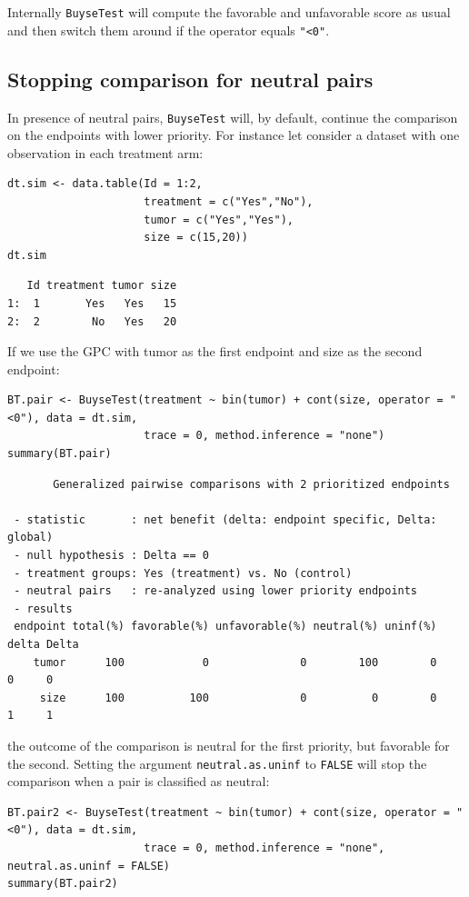 \documentclass[12pt]{article}
\begin{document}
Internally \texttt{BuyseTest} will compute the favorable and unfavorable
score as usual and then switch them around if the operator equals
\texttt{"<0"}.

\clearpage

\subsection{Stopping comparison for neutral pairs}
\label{sec:org4b1a2e3}
In presence of neutral pairs, \texttt{BuyseTest} will, by default, continue
the comparison on the endpoints with lower priority. For instance let
consider a dataset with one observation in each treatment arm:
\lstset{language=r,label= ,caption= ,captionpos=b,numbers=none}
\begin{lstlisting}
dt.sim <- data.table(Id = 1:2,
                     treatment = c("Yes","No"),
                     tumor = c("Yes","Yes"),
                     size = c(15,20))
dt.sim
\end{lstlisting}

\begin{verbatim}
   Id treatment tumor size
1:  1       Yes   Yes   15
2:  2        No   Yes   20
\end{verbatim}


\bigskip

If we use the GPC with tumor as the first endpoint and size as the
second endpoint:
\lstset{language=r,label= ,caption= ,captionpos=b,numbers=none}
\begin{lstlisting}
BT.pair <- BuyseTest(treatment ~ bin(tumor) + cont(size, operator = "<0"), data = dt.sim,
                     trace = 0, method.inference = "none")
summary(BT.pair)
\end{lstlisting}

\begin{verbatim}
       Generalized pairwise comparisons with 2 prioritized endpoints

 - statistic       : net benefit (delta: endpoint specific, Delta: global) 
 - null hypothesis : Delta == 0 
 - treatment groups: Yes (treatment) vs. No (control) 
 - neutral pairs   : re-analyzed using lower priority endpoints
 - results
 endpoint total(%) favorable(%) unfavorable(%) neutral(%) uninf(%) delta Delta
    tumor      100            0              0        100        0     0     0
     size      100          100              0          0        0     1     1
\end{verbatim}

the outcome of the comparison is neutral for the first priority, but
favorable for the second. Setting the argument \texttt{neutral.as.uninf} to
\texttt{FALSE} will stop the comparison when a pair is classified as neutral:
\lstset{language=r,label= ,caption= ,captionpos=b,numbers=none}
\begin{lstlisting}
BT.pair2 <- BuyseTest(treatment ~ bin(tumor) + cont(size, operator = "<0"), data = dt.sim,
                     trace = 0, method.inference = "none", neutral.as.uninf = FALSE)
summary(BT.pair2)
\end{lstlisting}
\end{document}
